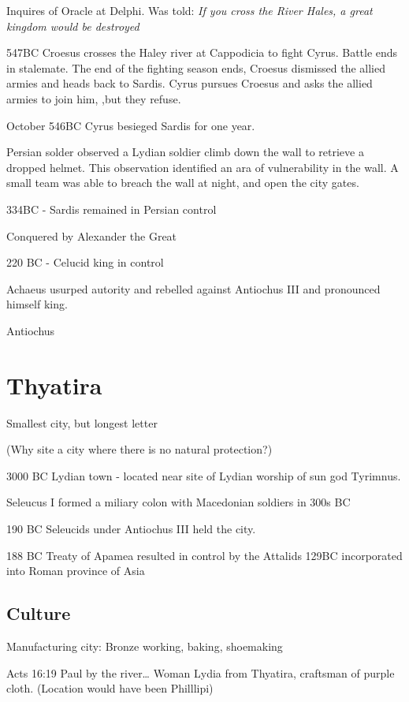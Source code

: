 \documentclass[
]{book}
\begin{document}
Inquires of Oracle at Delphi. Was told: \emph{If you cross the River Hales, a great kingdom would be destroyed}

547BC Croesus crosses the Haley river at Cappodicia to fight Cyrus. Battle ends in stalemate. The end of the fighting season ends, Croesus dismissed the allied armies and heads back to Sardis. Cyrus pursues Croesus and asks the allied armies to join him, ,but they refuse.

October 546BC Cyrus besieged Sardis for one year.

Persian solder observed a Lydian soldier climb down the wall to retrieve a dropped helmet. This observation identified an ara of vulnerability in the wall. A small team was able to breach the wall at night, and open the city gates.

334BC - Sardis remained in Persian control

Conquered by Alexander the Great

220 BC - Celucid king in control

Achaeus usurped autority and rebelled against Antiochus III and pronounced himself king.

Antiochus

\hypertarget{thyatira}{%
\chapter{Thyatira}\label{thyatira}}

Smallest city, but longest letter

(Why site a city where there is no natural protection?)

3000 BC Lydian town - located near site of Lydian worship of sun god Tyrimnus.

Seleucus I formed a miliary colon with Macedonian soldiers in 300s BC

190 BC Seleucids under Antiochus III held the city.

188 BC Treaty of Apamea resulted in control by the Attalids
129BC incorporated into Roman province of Asia

\hypertarget{culture-1}{%
\section{Culture}\label{culture-1}}

Manufacturing city: Bronze working, baking, shoemaking

Acts 16:19 Paul by the river\ldots{} Woman Lydia from Thyatira, craftsman of purple cloth. (Location would have been Philllipi)
\end{document}

